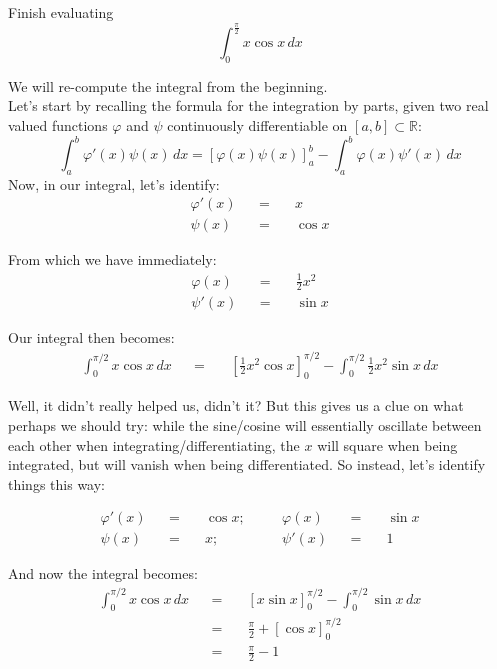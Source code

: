 \documentclass[solutions.tex]{subfiles}
\begin{document}
\maketitle
\begin{exercise} Finish evaluating
\[
	\int_0^{\frac\pi2}x\cos x\,dx
\]
\end{exercise}
We will re-compute the integral from the beginning. \\

Let's start by recalling the formula for the integration by parts,
given two real valued functions $\varphi$
and $\psi$ continuously differentiable on $[a,b]\subset\mathbb{R}$:
\[
	\boxed{\int_a^b\varphi'(x)\psi(x)\,dx =
		\left[\varphi(x)\psi(x)\right]_a^b
		- \int_a^b\varphi(x)\psi'(x)\,dx}
\]
Now, in our integral, let's identify:
\begin{equation*} \begin{aligned}
	\varphi'(x) &&=\quad& x \\
	\psi(x) &&=\quad& \cos x
\end{aligned} \end{equation*}

From which we have immediately:
\begin{equation*} \begin{aligned}
	\varphi(x) &&=\quad& \frac12x^2 \\
	\psi'(x) &&=\quad& \sin x
\end{aligned} \end{equation*}

Our integral then becomes:
\begin{equation*} \begin{aligned}
	\int_0^{\pi/2}x\cos x\,dx &&=\quad&
		\left[\frac12x^2\cos x\right]_0^{\pi/2}
		- \int_0^{\pi/2}\frac12x^2\sin x\,dx
\end{aligned} \end{equation*}

Well, it didn't really helped us, didn't it? But this
gives us a clue on what perhaps we should try: while
the sine/cosine will essentially oscillate between each
other when integrating/differentiating, the $x$ will
square when being integrated, but will vanish when being
differentiated. So instead, let's identify things this
way:

\begin{equation*} \begin{aligned}
	\varphi'(x) &&=\quad& \cos x; &\quad& \varphi(x) &&=\quad& \sin x \\
	\psi(x) &&=\quad& x; &\quad& \psi'(x) &&=\quad& 1
\end{aligned} \end{equation*}

And now the integral becomes:
\begin{equation*} \begin{aligned}
	\int_0^{\pi/2}x\cos x\,dx &&=\quad&
		\left[x\sin x\right]_0^{\pi/2}
		- \int_0^{\pi/2}\sin x\,dx \\
	~ &&=\quad& \frac\pi2 + \left[\cos x\right]_0^{\pi/2} \\
	~ &&=\quad& \boxed{\frac\pi2 - 1}
\end{aligned} \end{equation*}
\end{document}
